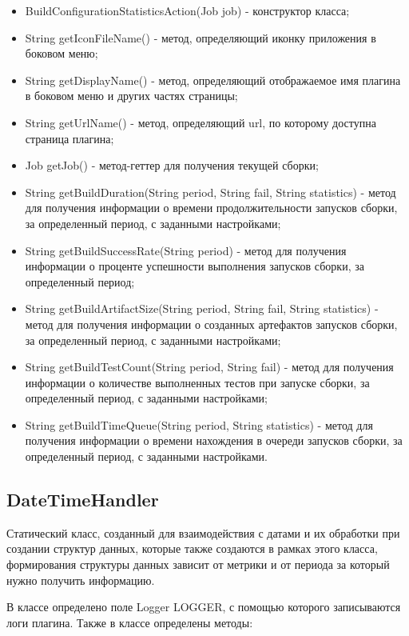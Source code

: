 \begin{itemize}
	\item BuildConfigurationStatisticsAction(Job job) - конструктор класса;
	\item String getIconFileName() - метод, определяющий иконку приложения в боковом меню;
	\item String getDisplayName() - метод, определяющий отображаемое имя плагина в боковом меню и других частях страницы;
	\item String getUrlName() - метод, определяющий url, по которому доступна страница плагина;
	\item Job getJob() - метод-геттер для получения текущей сборки;
	\item String getBuildDuration(String period, String fail, String statistics) - метод для получения информации о времени продолжительности запусков сборки, за определенный период, с заданными настройками;
	\item String getBuildSuccessRate(String period) - метод для получения информации о проценте успешности выполнения запусков сборки, за определенный период;
	\item String getBuildArtifactSize(String period, String fail, String statistics) - метод для получения информации о созданных артефактов запусков сборки, за определенный период, с заданными настройками;
	\item String getBuildTestCount(String period, String fail) - метод для получения информации о количестве выполненных тестов при запуске сборки, за определенный период, с заданными настройками;
	\item String getBuildTimeQueue(String period, String statistics) - метод для получения информации о времени нахождения в очереди запусков сборки, за определенный период, с заданными настройками.
\end{itemize}

\subsection{DateTimeHandler}

Статический класс, созданный для взаимодействия с датами и их обработки при создании структур данных, которые также создаются в рамках этого класса, формирования структуры данных зависит от метрики и от периода за который нужно получить информацию.

В классе определено поле Logger LOGGER, с помощью которого записываются логи плагина. Также в классе определены методы:

